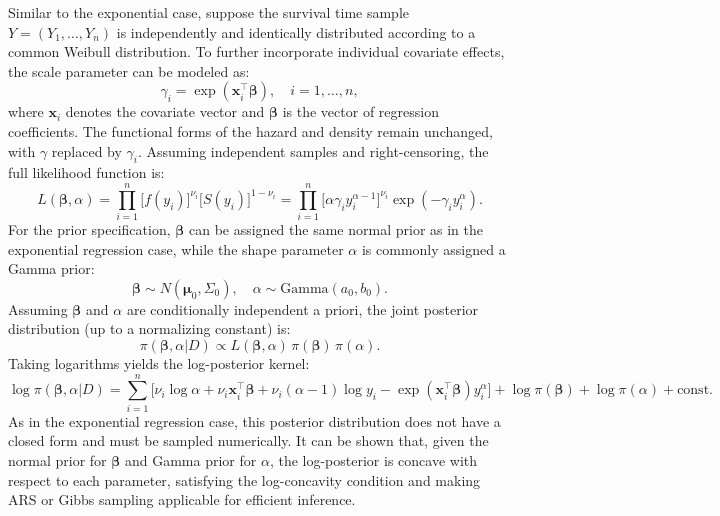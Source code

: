 Similar to the exponential case, suppose the survival time sample $Y = (Y_1, \ldots, Y_n)$ is independently and identically distributed according to a common Weibull distribution. To further incorporate individual covariate effects, the scale parameter can be modeled as:
$$
\gamma_i = \exp(\mathbf{x}_i^\top \boldsymbol{\beta}),
\quad i = 1, \ldots, n,
$$
where $\mathbf{x}_i$ denotes the covariate vector and $\boldsymbol{\beta}$ is the vector of regression coefficients. The functional forms of the hazard and density remain unchanged, with $\gamma$ replaced by $\gamma_i$.
Assuming independent samples and right-censoring, the full likelihood function is:
$$
L(\boldsymbol{\beta}, \alpha)
= \prod_{i=1}^n 
\big[ f(y_i) \big]^{\nu_i} 
\big[ S(y_i) \big]^{1 - \nu_i}
= \prod_{i=1}^n 
\big[ \alpha \gamma_i y_i^{\alpha - 1} \big]^{\nu_i} 
\exp(-\gamma_i y_i^\alpha).
$$
For the prior specification, $\boldsymbol{\beta}$ can be assigned the same normal prior as in the exponential regression case, while the shape parameter $\alpha$ is commonly assigned a Gamma prior:
$$
\boldsymbol{\beta} \sim N(\boldsymbol{\mu}_0, \Sigma_0), 
\quad 
\alpha \sim \text{Gamma}(a_0, b_0).
$$
Assuming $\boldsymbol{\beta}$ and $\alpha$ are conditionally independent a priori, the joint posterior distribution (up to a normalizing constant) is:
$$
\pi(\boldsymbol{\beta}, \alpha | D)
\propto L(\boldsymbol{\beta}, \alpha)
\, \pi(\boldsymbol{\beta})
\, \pi(\alpha).
$$
Taking logarithms yields the log-posterior kernel:
$$
\log \pi(\boldsymbol{\beta}, \alpha | D)
= \sum_{i=1}^n 
\big[
\nu_i \log \alpha + \nu_i \mathbf{x}_i^\top \boldsymbol{\beta} 
+ \nu_i (\alpha - 1) \log y_i 
- \exp(\mathbf{x}_i^\top \boldsymbol{\beta}) y_i^\alpha
\big]
+ \log \pi(\boldsymbol{\beta}) + \log \pi(\alpha) + \text{const}.
$$
As in the exponential regression case, this posterior distribution does not have a closed form and must be sampled numerically. It can be shown that, given the normal prior for $\boldsymbol{\beta}$ and Gamma prior for $\alpha$, the log-posterior is concave with respect to each parameter, satisfying the log-concavity condition and making ARS or Gibbs sampling applicable for efficient inference.